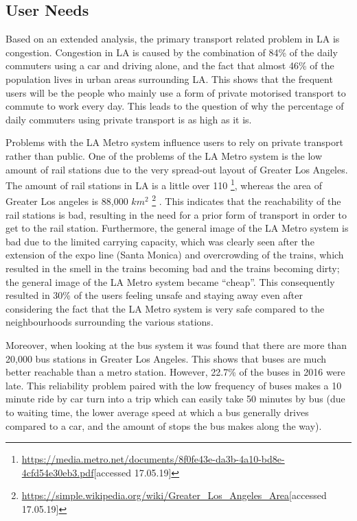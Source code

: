 \subsection{User Needs}
\label{needs}
Based on an extended analysis, the primary transport related problem in LA is congestion. Congestion in LA is caused by the combination of 84\% of the daily commuters using a car and driving alone, and the fact that almost 46\% of the population lives in urban areas surrounding LA. This shows that the frequent users will be the people who mainly use a form of private motorised transport to commute to work every day. This leads to the question of why the percentage of daily commuters using private transport is as high as it is. 

Problems with the LA Metro system influence users to rely on private transport rather than public. One of the problems of the LA Metro system is the low amount of rail stations due to the very spread-out layout of Greater Los Angeles. The amount of rail stations in LA is a little over 110 \footnote{\url{https://media.metro.net/documents/8f0fe43e-da3b-4a10-bd8e-4cfd54e30eb3.pdf}[accessed 17.05.19]}, whereas the area of Greater Los angeles is 88,000 $km^{2}$ \footnote{\url{https://simple.wikipedia.org/wiki/Greater_Los_Angeles_Area}[accessed 17.05.19]} . This indicates that the reachability of the rail stations is bad, resulting in the need for a prior form of transport in order to get to the rail station. Furthermore, the general image of the LA Metro system is bad due to the limited carrying capacity, which was clearly seen after the extension of the expo line (Santa Monica) and overcrowding of the trains, which resulted in the smell in the trains becoming bad and the trains becoming dirty; the general image of the LA Metro system became “cheap”. This consequently resulted in 30\% of the users feeling unsafe and staying away even after considering the fact that the LA Metro system is very safe compared to the neighbourhoods surrounding the various stations. 

Moreover, when looking at the bus system it was found that there are more than 20,000 bus stations in Greater Los Angeles. This shows that buses are much better reachable than a metro station. However, 22.7\% of the buses in 2016 were late. This reliability problem paired with the low frequency of buses makes a 10 minute ride by car turn into a trip which can easily take 50 minutes by bus (due to waiting time, the lower average speed at which a bus generally drives compared to a car, and the amount of stops the bus makes along the way). 

